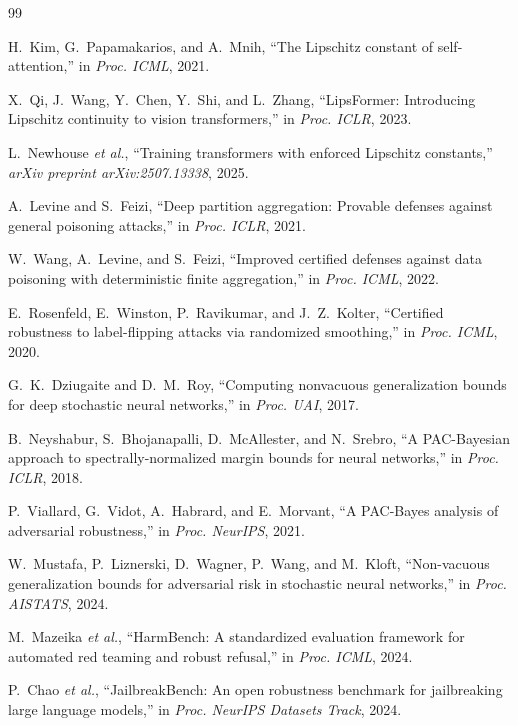 \documentclass[12pt,a4paper]{article}
\theoremstyle{definition}
\theoremstyle{remark}
\begin{document}
\begin{thebibliography}{99}

H.~Kim, G.~Papamakarios, and A.~Mnih, ``The {Lipschitz} constant of self-attention,'' in \emph{Proc. ICML}, 2021.

X.~Qi, J.~Wang, Y.~Chen, Y.~Shi, and L.~Zhang, ``{LipsFormer}: Introducing {Lipschitz} continuity to vision transformers,'' in \emph{Proc. ICLR}, 2023.

L.~Newhouse \emph{et al.}, ``Training transformers with enforced {Lipschitz} constants,'' \emph{arXiv preprint arXiv:2507.13338}, 2025.

A.~Levine and S.~Feizi, ``Deep partition aggregation: Provable defenses against general poisoning attacks,'' in \emph{Proc. ICLR}, 2021.

W.~Wang, A.~Levine, and S.~Feizi, ``Improved certified defenses against data poisoning with deterministic finite aggregation,'' in \emph{Proc. ICML}, 2022.

E.~Rosenfeld, E.~Winston, P.~Ravikumar, and J.~Z.~Kolter, ``Certified robustness to label-flipping attacks via randomized smoothing,'' in \emph{Proc. ICML}, 2020.


G.~K.~Dziugaite and D.~M.~Roy, ``Computing nonvacuous generalization bounds for deep stochastic neural networks,'' in \emph{Proc. UAI}, 2017.

B.~Neyshabur, S.~Bhojanapalli, D.~McAllester, and N.~Srebro, ``A {PAC}-Bayesian approach to spectrally-normalized margin bounds for neural networks,'' in \emph{Proc. ICLR}, 2018.

P.~Viallard, G.~Vidot, A.~Habrard, and E.~Morvant, ``A {PAC}-Bayes analysis of adversarial robustness,'' in \emph{Proc. NeurIPS}, 2021.

W.~Mustafa, P.~Liznerski, D.~Wagner, P.~Wang, and M.~Kloft, ``Non-vacuous generalization bounds for adversarial risk in stochastic neural networks,'' in \emph{Proc. AISTATS}, 2024.

M.~Mazeika \emph{et al.}, ``{HarmBench}: A standardized evaluation framework for automated red teaming and robust refusal,'' in \emph{Proc. ICML}, 2024.

P.~Chao \emph{et al.}, ``{JailbreakBench}: An open robustness benchmark for jailbreaking large language models,'' in \emph{Proc. NeurIPS Datasets Track}, 2024.


\end{thebibliography}
\end{document}
